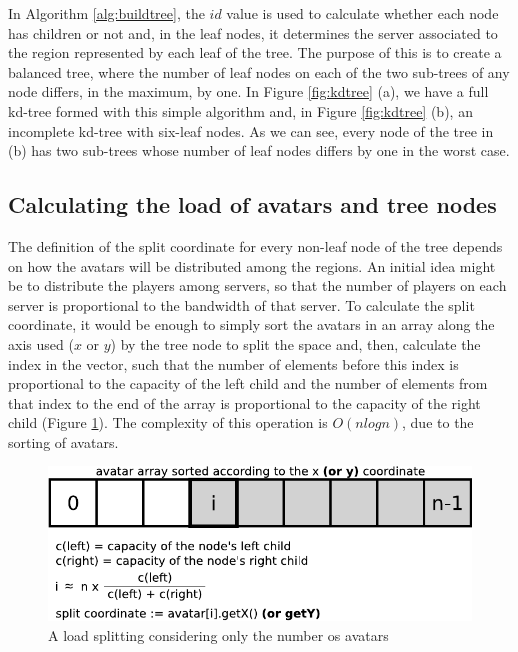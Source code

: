 \documentclass[acmjacm]{acmtrans2m}
\begin{document}
In Algorithm \ref{alg:buildtree}, the $id$ value is used to calculate whether each node has children or not and, in the leaf nodes, it determines the server associated to the region represented by each leaf of the tree. The purpose of this is to create a balanced tree, where the number of leaf nodes on each of the two sub-trees of any node differs, in the maximum, by one. In Figure \ref{fig:kdtree} (a), we have a full kd-tree formed with this simple algorithm and, in Figure \ref{fig:kdtree} (b), an incomplete kd-tree with six-leaf nodes. As we can see, every node of the tree in (b) has two sub-trees whose number of leaf nodes differs by one in the worst case.

\subsection{Calculating the load of avatars and tree nodes}

The definition of the split coordinate for every non-leaf node of the tree depends on how the avatars will be distributed among the regions. An initial idea might be to distribute the players among servers, so that the number of players on each server is proportional to the bandwidth of that server. To calculate the split coordinate, it would be enough to simply sort the avatars in an array along the axis used ($x$ or $y$) by the tree node to split the space and, then, calculate the index in the vector, such that the number of elements before this index is proportional to the capacity of the left child and the number of elements from that index to the end of the array is proportional to the capacity of the right child (Figure \ref{fig:vector}). The complexity of this operation is $O(nlogn)$, due to the sorting of avatars.

\begin{figure}
  \centering
  \includegraphics[width=0.8\linewidth]{images/vector}
  \caption{A load splitting considering only the number os avatars}
  \label{fig:vector}
\end{figure}
\end{document}
